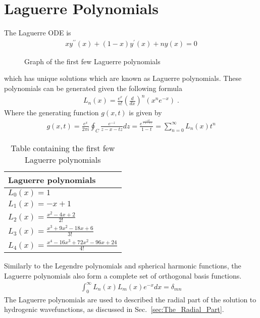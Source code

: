         \section{Laguerre Polynomials} \label{sec:Laguerre_Polynomial}
        The Laguerre ODE is 
        \begin{align}
            xy^{\prime \prime}(x) + (1 - x)y^\prime(x) + ny(x) = 0 
        \end{align}
        \begin{figure}[h]
            \centering
            \resizebox{0.8\linewidth}{!}{}
            \caption{Graph of the first few Laguerre polynomials}
            \label{img:Laguerre_polynomials}
        \end{figure}
        \noindent which has unique solutions which are known as Laguerre polynomials. These polynomials can be generated given the following formula 
        \begin{align}
            L_n(x) = \frac{e^x}{n!} \left( \frac{d}{dx} \right)^n (x^ne^{-x})\;.
        \end{align}
        \noindent Where the generating function $g(x, t)$ is given by \cite{Arfken_Weber_Arfken_Weber_2008}
        \begin{align}
            g(x, t) = \frac{e^x}{2\pi i} \oint_C \frac{e^{-z}}{z - x - tz} dz = \frac{e^{\frac{-xt}{(1 - t)}}}{1 - t} = \sum_{n = 0}^\infty L_n(x) t^n
        \end{align}
        \begin{table}
            \centering 
            \begin{tabular}{l}
                Laguerre polynomials\\
                \hline 
                $L_0(x) = 1$\\
                $L_1(x) = -x + 1$\\
                $L_2(x) = \frac{x^2 - 4x + 2}{2!}$\\
                $L_3(x) = \frac{x^3 + 9x^2 - 18x + 6}{3!}$\\
                $L_4(x) = \frac{x^4 - 16x^3 + 72x^2 - 96x + 24}{4!}$\\
                \hline
            \end{tabular}
            \caption{Table containing the first few Laguerre polynomials}
            \label{tab:Laguerre_polynomial_table}
        \end{table}
        \noindent Similarly to the Legendre polynomials and spherical harmonic functions, the Laguerre polynomials also form a complete set of orthogonal basis functions.
        \begin{align}
            \int_0^\infty L_n(x) L_m(x) e^{-x} dx = \delta_{m n}
        \end{align}
        \noindent The Laguerre polynomials are used to described the radial part of the solution to hydrogenic wavefunctions, as discussed in Sec.~\ref{sec:The_Radial_Part}. 
